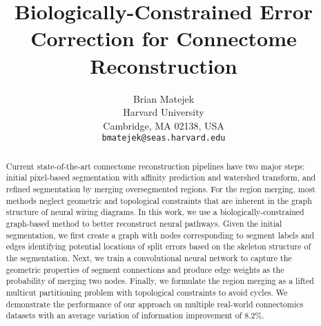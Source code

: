 \documentclass[10pt,twocolumn,letterpaper]{article}
\begin{document}
	
	\title{Biologically-Constrained Error Correction for Connectome Reconstruction}

	\author{Brian Matejek\\
	Harvard University\\
	Cambridge, MA 02138, USA\\
	{\tt\small bmatejek@seas.harvard.edu}
	}
	
	\maketitle
	
	\begin{abstract}
Current state-of-the-art connectome reconstruction pipelines have two major steps: initial pixel-based segmentation with affinity prediction and watershed transform, and refined segmentation by merging oversegmented regions.
For the region merging, most methods neglect geometric and topological constraints that are inherent in the graph structure of neural wiring diagrams.
In this work, we use a biologically-constrained graph-based method to better reconstruct neural pathways.
Given the initial segmentation, we first create a graph with nodes corresponding to segment labels and edges identifying potential locations of split errors based on the skeleton structure of the segmentation.
Next, we train a convolutional neural network to capture the geometric properties of segment connections and produce edge weights as the probability of merging two nodes.
Finally, we formulate the region merging as a lifted multicut partitioning problem with topological constraints to avoid cycles.
We demonstrate the performance of our approach on multiple real-world connectomics datasets with an average variation of information improvement of 8.2\%.
	\end{abstract}
	
	
	
	
	
	
	
	
	
	
	
	
	
	
	{\small
		
		}
	
\end{document}
